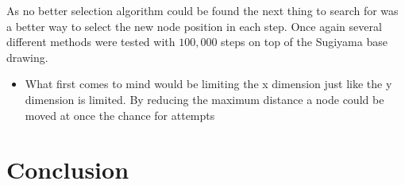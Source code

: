 \documentclass[]{llncs}
\begin{document}
	As no better selection algorithm could be found the next thing to search for was a better way to select the new node position in each step. Once again several different methods were tested with $100,000$ steps on top of the Sugiyama base drawing.
	\begin{itemize}
		\item What first comes to mind would be limiting the x dimension just like the y dimension is limited. By reducing the maximum distance a node could be moved at once the chance for attempts
	\end{itemize}

    \section{Conclusion}

    \printbibliography
\end{document}
